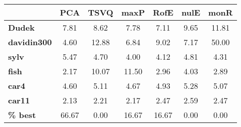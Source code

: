 \begin{tabular}{|l|c|c|c|c|c|c|}
\hline
&\textbf{PCA}&\textbf{TSVQ}&\textbf{maxP}&\textbf{RofE}&\textbf{nulE}&\textbf{monR}\\\hline
\textbf{Dudek}&7.81&8.62&7.78&7.11&9.65&11.81\\\hline
\textbf{davidin300}&4.60&12.88&6.84&9.02&7.17&50.00\\\hline
\textbf{sylv}&5.47&4.70&4.00&4.12&4.81&4.31\\\hline
\textbf{fish}&2.17&10.07&11.50&2.96&4.03&2.89\\\hline
\textbf{car4}&4.60&5.11&4.67&4.93&5.28&5.07\\\hline
\textbf{car11}&2.13&2.21&2.17&2.47&2.59&2.47\\\hline
\textbf{ \% best}&66.67&0.00&16.67&16.67&0.00&0.00\\\hline
\end{tabular}
